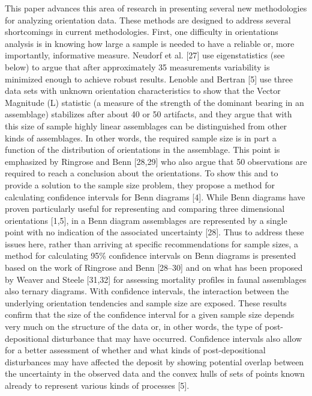 \documentclass[]{article}
\begin{document}
This paper advances this area of research in presenting several new
methodologies for analyzing orientation data. These methods are designed
to address several shortcomings in current methodologies. First, one
difficulty in orientations analysis is in knowing how large a sample is
needed to have a reliable or, more importantly, informative measure.
Neudorf et al. {[}27{]} use eigenstatistics (see below) to argue that
after approximately 35 measurements variability is minimized enough to
achieve robust results. Lenoble and Bertran {[}5{]} use three data sets
with unknown orientation characteristics to show that the Vector
Magnitude (L) statistic (a measure of the strength of the dominant
bearing in an assemblage) stabilizes after about 40 or 50 artifacts, and
they argue that with this size of sample highly linear assemblages can
be distinguished from other kinds of assemblages. In other words, the
required sample size is in part a function of the distribution of
orientations in the assemblage. This point is emphasized by Ringrose and
Benn {[}28,29{]} who also argue that 50 observations are required to
reach a conclusion about the orientations. To show this and to provide a
solution to the sample size problem, they propose a method for
calculating confidence intervals for Benn diagrams {[}4{]}. While Benn
diagrams have proven particularly useful for representing and comparing
three dimensional orientations {[}1,5{]}, in a Benn diagram assemblages
are represented by a single point with no indication of the associated
uncertainty {[}28{]}. Thus to address these issues here, rather than
arriving at specific recommendations for sample sizes, a method for
calculating 95\% confidence intervals on Benn diagrams is presented
based on the work of Ringrose and Benn {[}28--30{]} and on what has been
proposed by Weaver and Steele {[}31,32{]} for assessing mortality
profiles in faunal assemblages also ternary diagrams. With confidence
intervals, the interaction between the underlying orientation tendencies
and sample size are exposed. These results confirm that the size of the
confidence interval for a given sample size depends very much on the
structure of the data or, in other words, the type of post-depositional
disturbance that may have occurred. Confidence intervals also allow for
a better assessment of whether and what kinds of post-depositional
disturbances may have affected the deposit by showing potential overlap
between the uncertainty in the observed data and the convex hulls of
sets of points known already to represent various kinds of processes
{[}5{]}.
\end{document}
